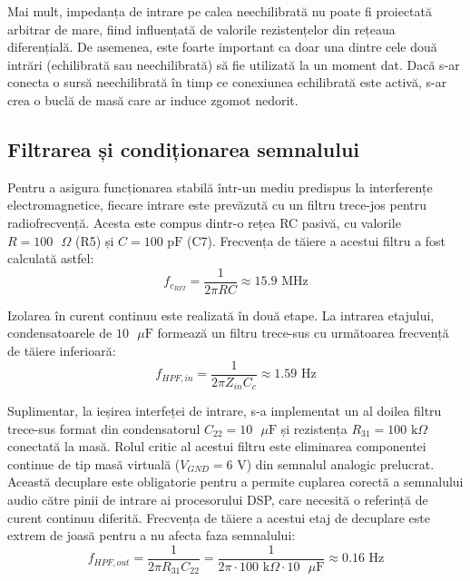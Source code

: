 Mai mult, impedanța de intrare pe calea neechilibrată nu poate fi proiectată arbitrar de mare, fiind influențată de valorile rezistențelor din rețeaua diferențială. De asemenea, este foarte important ca doar una dintre cele două intrări (echilibrată sau neechilibrată) să fie utilizată la un moment dat. Dacă s-ar conecta o sursă neechilibrată în timp ce conexiunea echilibrată este activă, s-ar crea o buclă de masă care ar induce zgomot nedorit. 

\subsection{Filtrarea și condiționarea semnalului}
Pentru a asigura funcționarea stabilă într-un mediu predispus la interferențe electromagnetice, fiecare intrare este prevăzută cu un filtru trece-jos pentru radiofrecvență. Acesta este compus dintr-o rețea RC pasivă, cu valorile $R = 100\text{ }\Omega$ (R5) și $C = 100\text{ pF}$ (C7). Frecvența de tăiere a acestui filtru a fost calculată astfel:
\begin{equation}
    f_{c_{RFI}} = \frac{1}{2\pi R C} \approx 15.9\text{ MHz}
\end{equation}

Izolarea în curent continuu este realizată în două etape. La intrarea etajului, condensatoarele de $10\text{ }\mu\text{F}$ formează un filtru trece-sus cu următoarea frecvență de tăiere inferioară:
\begin{equation}
    f_{HPF,in} = \frac{1}{2\pi Z_{in} C_c} \approx 1.59\text{ Hz}
\end{equation}

Suplimentar, la ieșirea interfeței de intrare, s-a implementat un al doilea filtru trece-sus format din condensatorul $C_{22} = 10\text{ }\mu\text{F}$ și rezistența $R_{31} = 100\text{ k}\Omega$ conectată la masă. Rolul critic al acestui filtru este eliminarea componentei continue de tip masă virtuală ($V_{GND} = 6\text{ V}$) din semnalul analogic prelucrat. Această decuplare este obligatorie pentru a permite cuplarea corectă a semnalului audio către pinii de intrare ai procesorului DSP, care necesită o referință de curent continuu diferită. Frecvența de tăiere a acestui etaj de decuplare este extrem de joasă pentru a nu afecta faza semnalului:
\begin{equation}
    f_{HPF,out} = \frac{1}{2\pi R_{31} C_{22}} = \frac{1}{2\pi \cdot 100\text{ k}\Omega \cdot 10\text{ }\mu\text{F}} \approx 0.16\text{ Hz}
\end{equation}

